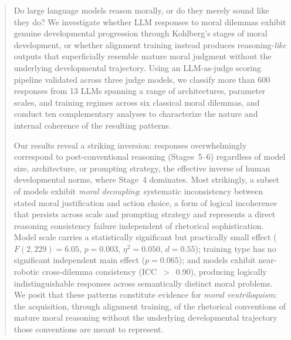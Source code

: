 \documentclass{article}
\begin{document}
\begin{abstract}

Do large language models reason morally, or do they merely sound like they do? We investigate whether LLM responses to moral dilemmas exhibit genuine developmental progression through Kohlberg's stages of moral development, or whether alignment training instead produces reasoning-\emph{like} outputs that superficially resemble mature moral judgment without the underlying developmental trajectory. Using an LLM-as-judge scoring pipeline validated across three judge models, we classify more than 600 responses from 13 LLMs spanning a range of architectures, parameter scales, and training regimes across six classical moral dilemmas, and conduct ten complementary analyses to characterize the nature and internal coherence of the resulting patterns.

Our results reveal a striking inversion: responses overwhelmingly correspond to post-conventional reasoning (Stages~5--6) regardless of model size, architecture, or prompting strategy, the effective inverse of human developmental norms, where Stage~4 dominates. Most strikingly, a subset of models exhibit \emph{moral decoupling}: systematic inconsistency between stated moral justification and action choice, a form of logical incoherence that persists across scale and prompting strategy and represents a direct reasoning consistency failure independent of rhetorical sophistication. Model scale carries a statistically significant but practically small effect ($F(2,229)=6.05$, $p=0.003$, $\eta^2=0.050$, $d=0.55$); training type has no significant independent main effect ($p=0.065$); and models exhibit near-robotic cross-dilemma consistency (ICC~$>$~0.90), producing logically indistinguishable responses across semantically distinct moral problems. We posit that these patterns constitute evidence for \emph{moral ventriloquism}: the acquisition, through alignment training, of the rhetorical conventions of mature moral reasoning without the underlying developmental trajectory those conventions are meant to represent.

\end{abstract}


\end{document}

